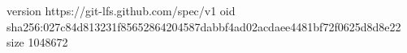 version https://git-lfs.github.com/spec/v1
oid sha256:027c84d813231f85652864204587dabbf4ad02acdaee4481bf72f0625d8d8e22
size 1048672
